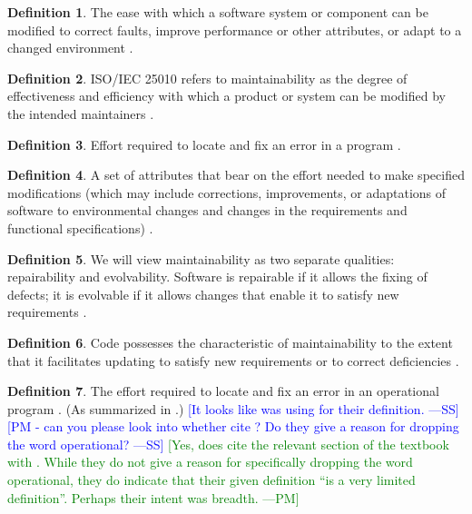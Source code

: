 \documentclass[letterpaper,cleveref]{lipics-v2019}
\newcommand{\authornote}[3]{\textcolor{#1}{[#3 ---#2]}}
\newcommand{\authornote}[3]{}
\newcommand{\wss}[1]{\authornote{blue}{SS}{#1}} %
\newcommand{\pmi}[1]{\authornote{green}{PM}{#1}} %
\theoremstyle{definition}
\newtheorem{defn}{Definition}
\begin{document}
\begin{defn} \label{MaintainabilityDefnSelected1}
	The ease with which a software system or component can be modified to correct
	faults, improve performance or other attributes, or adapt to a changed
	environment \citep{IEEEStdGlossarySET1990}. 
\end{defn}
\begin{defn}
	ISO/IEC 25010 refers to maintainability as the degree of effectiveness and
	efficiency with which a product or system can be modified by the intended
	maintainers \citep{ISO/IEC25010}.
\end{defn}
\begin{defn}
	Effort required to locate and fix an error in a program
	\citep{pressman2005software}.
\end{defn}
\begin{defn}
	A set of attributes that bear on the effort needed to make specified
	modifications (which may include corrections, improvements, or adaptations of
	software to environmental changes and changes in the requirements and functional
	specifications) \citep{pfleeger2006software}.
\end{defn}
\begin{defn}
	We will view maintainability as two separate qualities: repairability and
	evolvability. Software is repairable if it allows the fixing of defects; it is
	evolvable if it allows changes that enable it to satisfy new requirements
	\citep{ghezzi1991fundamentals}.
\end{defn}
\begin{defn} \label{MaintainabilityDefnSelected2}
	Code possesses the characteristic of maintainability to the extent that it
	facilitates updating to satisfy new requirements or to correct deficiencies
	\citep{boehm2007software}.
\end{defn}

\begin{defn}
	The effort required to locate and fix an error in an operational program
	\citep{McCallEtAl1977}. (As summarized in \citet{VanVliet2000}.) \wss{It looks
		like \citet{pressman2005software} was using \citet{McCallEtAl1977} for their
		definition.} \wss{PM - can you please look into whether
		\citet{pressman2005software} cite \citet{McCallEtAl1977}?  Do they give a
		reason for dropping the word operational?}
	\pmi{Yes, \citet{pressman2005software} does cite the relevant section of the
		textbook with \citet{McCallEtAl1977}. While they do not give a reason for
		specifically dropping the word operational, they do indicate that their given
		definition ``is a very limited definition''. Perhaps their intent was breadth.}
\end{defn}
\end{document}
